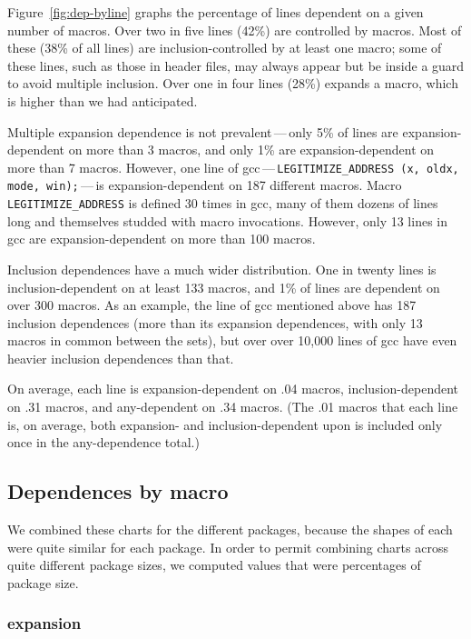 \documentclass[10pt]{article}
\newcommand{\pkg}[1]{\textsf{#1}}
\begin{document}
Figure~\ref{fig:dep-byline} graphs the percentage of lines dependent on a
given number of macros.  Over two in five lines (42\%) are controlled by
macros.  Most of these (38\% of all lines) are inclusion-controlled by at
least one macro; some of these lines, such as those in header files, may
always appear but be inside a guard to avoid multiple inclusion.  Over one
in four lines (28\%) expands a macro, which is higher than we had
anticipated.  

Multiple expansion dependence is not prevalent\,---\,only 5\% of lines are
expansion-dependent on more than 3 macros, and only 1\% are
expansion-dependent on more than 7 macros.  However, one line of
\pkg{gcc}\,---\,{\tt \verb|LEGITIMIZE_ADDRESS| (x, oldx, mode,
win);}\,---\,is expansion-dependent on 187 different macros.  Macro
\verb|LEGITIMIZE_ADDRESS| is defined 30 times in \pkg{gcc}, many of them
dozens of lines long and themselves studded with macro invocations.
However, only 13 lines in \pkg{gcc} are expansion-dependent on more than
100 macros.

Inclusion dependences have a much wider distribution.  One in twenty lines
is inclusion-dependent on at least 133 macros, and 1\% of lines are
dependent on over 300 macros.  As an example, the line of \pkg{gcc}
mentioned above has 187 inclusion dependences (more than its expansion
dependences, with only 13 macros in common between the sets), but over over
10,000 lines of \pkg{gcc} have even heavier inclusion dependences than
that.

On average, each line is expansion-dependent on .04 macros,
inclusion-dependent on .31 macros, and any-dependent on .34 macros.  (The
.01 macros that each line is, on average, both expansion- and
inclusion-dependent upon is included only once in the any-dependence
total.)

      

\subsection{Dependences by macro}

    We combined these charts for the different packages, because the shapes
      of each were quite similar for each package.  In order to permit
      combining charts across quite different package sizes, we computed
      values that were percentages of package size.

   \subsubsection{expansion}
\end{document}
